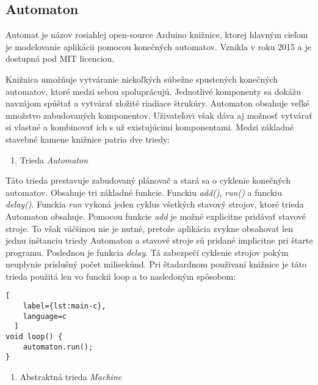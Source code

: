 
\subsection{Automaton}
\noindent Automat je názov rosiahlej open-source Arduino knižnice, ktorej hlavným cieľom
je modelovanie aplikácii pomocou konečných automatov. Vznikla v roku 2015 a je dostupná pod MIT licenciou.
\par Knižnica umožňuje vytváranie niekoľkých súbežne spustených konečných automatov, ktoré medzi sebou spoluprácujú. Jednotlivé komponenty sa dokážu navzájom spúštať a vytvárať zložité riadiace štrukúry. Automaton obsahuje veľké množstvo zabudovaných komponentov. Uživateľovi však dáva aj možnosť vytvárať si vlastné a kombinovať ich s už existujúcimi komponentami. Medzi základné stavebné kamene knižnice patria dve triedy: 
\begin{enumerate}
    \item Trieda \textit{Automaton}
\end{enumerate}

\noindent \par Táto trieda prestavuje zabudovaný plánovač a stará sa o cyklenie konečných automatov. Obsahuje tri základné funkcie. Funckiu \textit{add()}, \textit{run()} a funckiu \textit{delay()}. Funckia \textit{run} vykoná jeden cyklus všetkých stavový strojov, ktoré trieda Automaton obsahuje. Pomocou funkcie \textit{add} je možné explicitne pridávať stavové stroje. To však väčšinou nie je nutné, pretože aplikácia zvykne obsahovať len jednu inštanciu triedy Automaton a stavové stroje sú pridané implicitne pri štarte programu. Poslednou je funkcia \textit{delay}. Tá zabezpečí cyklenie strojov pokým neuplynie príslušný počet milisekúnd.  Pri štadardnom použivaní knižnice je táto trieda použitá len vo funckii loop a to nasledoným spôsobom:

\begin{lstlisting}[
    label={lst:main-c},
    language=c
  ]
void loop() {
    automaton.run();
}

\end{lstlisting}

\begin{enumerate}[resume]
    \item Abstraktná trieda \textit{Machine}
\end{enumerate}

